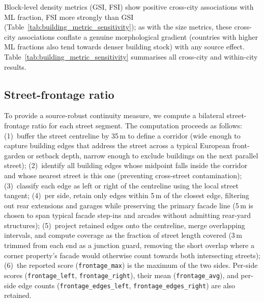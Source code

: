 Block-level density metrics (GSI, FSI) show positive cross-city associations with ML fraction, FSI more strongly than GSI (Table~\ref{tab:building_metric_sensitivity}); as with the size metrics, these cross-city associations conflate a genuine morphological gradient (countries with higher ML fractions also tend towards denser building stock) with any source effect. Table~\ref{tab:building_metric_sensitivity} summarises all cross-city and within-city results.

\begin{table}[!htb]
  \centering
  \caption{Sensitivity of building morphometric indicators to data source composition. Cross-city $\rho$: Spearman correlation between city ML fraction and city median metric value, across all \NCitiesTotal{} cities. Within-city $r$: median rank-biserial correlation from Mann--Whitney $U$ tests comparing community and ML-derived buildings within each city, restricted to cities containing both source types. Significance: {*}{*}{*}\,$p < 0.001$, {*}{*}\,$p < 0.01$, {*}\,$p < 0.05$.}
  \label{tab:building_metric_sensitivity}
  \scriptsize
  
\end{table}

\subsection{Street-frontage ratio}
\label{sec:bldg-supp-frontage}

To provide a source-robust continuity measure, we compute a bilateral street-frontage ratio for each street segment. The computation proceeds as follows: (1)~buffer the street centreline by 35\,m to define a corridor (wide enough to capture building edges that address the street across a typical European front-garden or setback depth, narrow enough to exclude buildings on the next parallel street); (2)~identify all building edges whose midpoint falls inside the corridor and whose nearest street is this one (preventing cross-street contamination); (3)~classify each edge as left or right of the centreline using the local street tangent; (4)~per side, retain only edges within 5\,m of the closest edge, filtering out rear extensions and garages while preserving the primary facade line (5\,m is chosen to span typical facade step-ins and arcades without admitting rear-yard structures); (5)~project retained edges onto the centreline, merge overlapping intervals, and compute coverage as the fraction of street length covered (3\,m trimmed from each end as a junction guard, removing the short overlap where a corner property's facade would otherwise count towards both intersecting streets); (6)~the reported score (\texttt{frontage\_max}) is the maximum of the two sides. Per-side scores (\texttt{frontage\_left}, \texttt{frontage\_right}), their mean (\texttt{frontage\_avg}), and per-side edge counts (\texttt{frontage\_edges\_left}, \texttt{frontage\_edges\_right}) are also retained.

